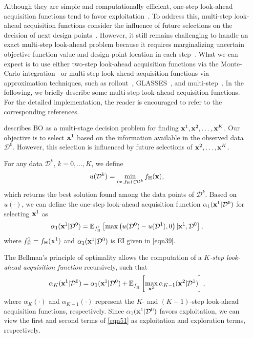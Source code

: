 \documentclass[iicol,sn-basic]{sn-jnl}%
\begin{document}
Although they are simple and computationally efficient, one-step look-ahead acquisition functions tend to favor exploitation~\citep{Hennig2022}.
To address this, multi-step look-ahead acquisition functions consider the influence of future selections on the decision of next design points~\citep[see e.g.,][]{Streltsov1999,Ginsbourger2010}.
However, it still remains challenging to handle an exact multi-step look-ahead problem because it requires marginalizing uncertain objective function value and design point location in each step~\citep{Gonzalez2016}.
What we can expect is to use either
two-step look-ahead acquisition functions via the Monte-Carlo integration~\citep{WuJ2019} or multi-step look-ahead acquisition functions via approximation techniques, such as rollout~\citep{Lam2016,Lee2020}, GLASSES~\citep{Gonzalez2016}, and multi-step~\citep{Jiang2020}.
In the following, we briefly describe some multi-step look-ahead acquisition functions.
For the detailed implementation, the reader is encouraged to refer to the corresponding references.

 describes BO as a multi-stage decision problem for finding ${\bf x}^1,{\bf x}^2,\dots,{\bf x}^{K}$.
Our objective is to select ${\bf x}^1$ based on the information available in the observed data $\mathcal{D}^0$.
However, this selection is influenced by future selections of ${\bf x}^2,\dots,{\bf x}^{K}$.

For any data $\mathcal{D}^k$, $k=0,\dots,K$, we define
\begin{equation}\label{eqn49}
	u(\mathcal{D}^k) = \underset{({\bf x},f_{\text{H}}) \in \mathcal{D}^k}{\min}\,f_{\text{H}}({\bf x}),
\end{equation} 
which returns the best solution found among the data points of $\mathcal{D}^k$.
Based on $u(\cdot)$, we can define the one-step look-ahead acquisition function $\alpha_1({\bf x}^1|\mathcal{D}^{0})$ for selecting ${\bf x}^1$ as
\begin{equation}\label{eqn50}
	\alpha_1({\bf x}^1|\mathcal{D}^0)
	=\mathbb{E}_{f^1_\text{H}}\left[\max\left(u(\mathcal{D}^0) - u(\mathcal{D}^1),0\right)
	|{\bf x}^1,\mathcal{D}^0\right],
\end{equation} 
where $f^1_\text{H} = f_\text{H}({\bf x}^1)$ and $\alpha_1({\bf x}^1|\mathcal{D}^{0})$ is EI given in \cref{eqn39}.

The Bellman's principle of optimality allows the computation of a \textit{$K$-step look-ahead acquisition function} recursively, such that~\citep{Bellman1952}
\begin{equation}\label{eqn51}
	\alpha_K({\bf x}^1|\mathcal{D}^0)
	=\alpha_1({\bf x}^1|\mathcal{D}^0) + \mathbb{E}_{f^1_\text{H}}\left[\underset{{\bf x}^2}{\max}\,\alpha_{K-1}({\bf x}^2|\mathcal{D}^1)\right],
\end{equation}
where $\alpha_K(\cdot)$ and $\alpha_{K-1}(\cdot)$ represent the $K$- and $(K-1)$-step look-ahead acquisition functions, respectively.
Since $\alpha_1({\bf x}^1|\mathcal{D}^0)$ favors exploitation, we can view the first and second terms of \cref{eqn51} as exploitation and exploration terms, respectively.
\end{document}
